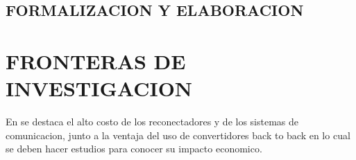 \documentclass[12pt, letterpaper]{report}
\begin{document}
\section{FORMALIZACION Y ELABORACION}




\chapter{FRONTERAS DE INVESTIGACION}
En \cite{Cao2016} se destaca el alto costo de los  reconectadores y de los sistemas de comunicacion, junto a la ventaja del uso de convertidores back to back en lo cual se deben hacer estudios para conocer su impacto economico.\\



%
\end{document}
